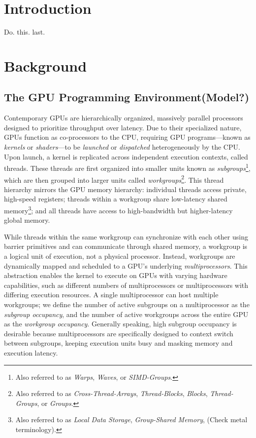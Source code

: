 \documentclass[sigconf]{acmart}
\begin{document}
\section{Introduction}
Do. this. last.

\section{Background}
\subsection{The GPU Programming Environment(Model?)}
Contemporary GPUs are hierarchically organized, massively parallel processors designed to prioritize throughput over latency. Due to their specialized nature, GPUs function as co-processors to the CPU, requiring GPU programs—known as \emph{kernels} or \emph{shaders}—to be \emph{launched} or \emph{dispatched} heterogeneously by the CPU. Upon launch, a kernel is replicated across independent execution contexts, called threads. These threads are first organized into smaller units known as \emph{subgroups}\footnote{Also referred to as \emph{Warps}, \emph{Waves}, or \emph{SIMD-Groups}.}, which are then grouped into larger units called \emph{workgroups}\footnote{Also referred to as \emph{Cross-Thread-Arrays}, \emph{Thread-Blocks}, \emph{Blocks}, \emph{Thread-Groups}, or \emph{Groups}.}. This thread hierarchy mirrors the GPU memory hierarchy: individual threads access private, high-speed registers; threads within a workgroup share low-latency shared memory\footnote{Also referred to as \emph{Local Data Storage}, \emph{Group-Shared Memory}, (Check metal terminology).}; and all threads have access to high-bandwidth but higher-latency global memory.

While threads within the same workgroup can synchronize with each other using barrier primitives and can communicate through shared memory, a workgroup is a logical unit of execution, not a physical processor. Instead, workgroups are dynamically mapped and scheduled to a GPU's underlying \emph{multiprocessors}. This abstraction enables the kernel to execute on GPUs with varying hardware capabilities, such as different numbers of multiprocessors or multiprocessors with differing execution resources. A single multiprocessor can host multiple workgroups; we define the number of active subgroups on a multiprocessor as the \emph{subgroup occupancy}, and the number of active workgroups across the entire GPU as the \emph{workgroup occupancy}. Generally speaking, high subgroup occupancy is desirable because multiprocessors are specifically designed to context switch between subgroups, keeping execution units busy and masking memory and execution latency.
\end{document}
